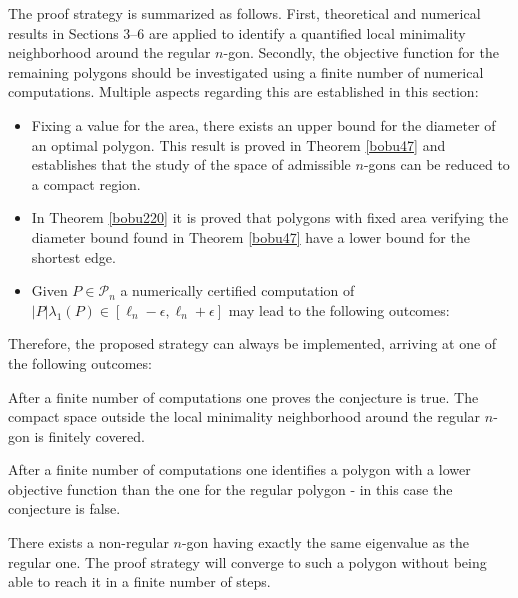 The proof strategy is summarized as follows. First, theoretical and numerical results in Sections 3--6 are applied to identify a quantified local minimality neighborhood around the regular $n$-gon. Secondly, the objective function for the remaining polygons should be investigated using a finite number of numerical computations. Multiple aspects regarding this are established in this section:
\begin{itemize}
\item Fixing a value for the area, there exists an upper bound for the diameter of an optimal polygon. This result is proved in Theorem \ref{bobu47} and establishes that the study of the space of admissible $n$-gons can be reduced to a compact region.
\item In Theorem \ref{bobu220} it is proved that polygons with fixed area verifying the diameter bound found in Theorem \ref{bobu47} have a lower bound for the shortest edge.
\item Given $P\in \mathcal P_n$ a numerically certified computation of $ |P|\lambda_1(P) \in [\ell_n-\epsilon,\ell_n+\epsilon]$ may lead to the following outcomes:
\end{itemize}

Therefore, the proposed strategy can always be implemented, arriving at one of the following outcomes:

\begin{enumeratea}
\item
After a finite number of computations one proves the conjecture is true. The compact space outside the local minimality neighborhood around the regular $n$-gon is finitely covered.

\item
After a finite number of computations one identifies a polygon with a lower objective function than the one for the regular polygon - in this case the conjecture is false.

\item
There exists a non-regular $n$-gon having exactly the same eigenvalue as the regular one. The proof strategy will converge to such a polygon without being able to reach it in a finite number of steps.
\end{enumeratea}

